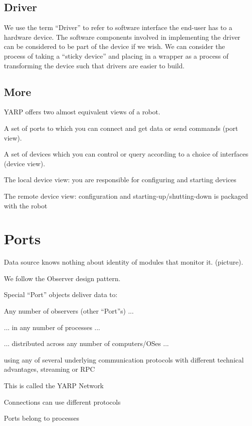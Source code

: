 \subsection{Driver}

We use the term ``Driver'' to refer to software interface the end-user
has to a hardware device.  The software components involved in
implementing the driver can be considered to be part of the device if
we wish.  We can consider the process of taking a ``sticky device''
and placing in a wrapper as a process of transforming the device such
that drivers are easier to build.


\subsection{More}


YARP offers two almost equivalent views of a robot.


A set of ports to which you can connect and get data or send commands
(port view).

A set of devices which you can control or query according to a choice
of interfaces (device view).

The local device view: you are responsible for configuring and starting devices

The remote device view: configuration and starting-up/shutting-down is
packaged with the robot



\section{Ports}

Data source knows nothing about identity of modules that monitor it.
(picture).

We follow the Observer design pattern. 

Special ``Port'' objects deliver data to:

Any number of observers (other ``Port''s) ...

... in any number of processes ...

... distributed across any number of computers/OSes ...

using any of several underlying communication protocols with different
technical advantages, streaming or RPC

This is called the YARP Network

Connections can use different protocols

Ports belong to processes


